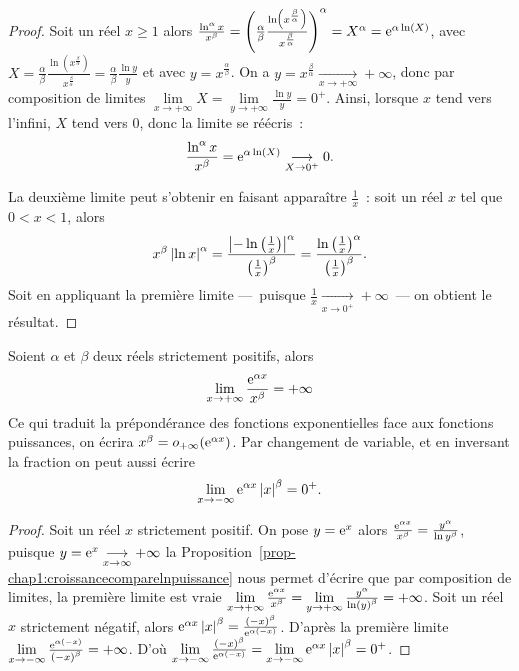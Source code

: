 \begin{proof}
  Soit un réel \(x \geqslant 1\) alors \(\frac{\ln^\alpha x}{x^\beta} =
  {\left(\frac{\alpha}{\beta}
  \frac{\ln\left(x^{\frac{\beta}{\alpha}}\right)}{x^{\frac{\beta}{\alpha}}}
  \right)}^\alpha = X^\alpha = \operatorname{e}^{\alpha \ln(X)}\), avec \(X =
  \frac{\alpha}{\beta}
  \frac{\ln\left(x^{\frac{\beta}{\alpha}}\right)}{x^{\frac{\beta}{\alpha}}}
  = \frac{\alpha}{\beta} \frac{\ln y}{y}\) et avec \(y =
  x^{\frac{\alpha}{\beta}}\). On a \(y =
  x^{\frac{\beta}{\alpha}}\underset{x \to
  +\infty}{\longrightarrow}+\infty\), donc par composition de limites
  \(\lim\limits_{x \to +\infty} X = \lim\limits_{y \to +\infty} \frac{\ln
  y }{y} = 0^{+}\). Ainsi, lorsque \(x\) tend vers l'infini, \(X\) tend
  vers \(0\), donc la limite se réécris~: \[\frac{\ln^\alpha x}{x^\beta}
  = \operatorname{e}^{\alpha \ln(X)} \underset{X \to{} 0^{+}}{\longrightarrow}0.\]

  La deuxième limite peut s'obtenir en faisant apparaître
  \(\frac{1}{x}\)~: soit un réel \(x\) tel que \(0<x<1\), alors \[x^\beta
  \left\lvert\ln x\right\rvert^\alpha =
  \frac{\left\lvert-\ln\left(\frac{1}{x}\right)\right\rvert^\alpha}{{\left(\frac{1}{x}
  \right)}^\beta} =
  \frac{\ln{\left(\frac{1}{x}\right)}^\alpha}{{\left(\frac{1}{x}\right)}^\beta}.\]
  Soit en appliquant la première limite ---~puisque
  \(\frac{1}{x}\underset{x \to{}0^+}{\longrightarrow}+\infty\)~--- on
  obtient le résultat.
\end{proof}

\begin{prop}
  Soient \(\alpha\) et \(\beta\) deux réels strictement positifs, alors
  \begin{equation}
    \lim\limits_{x\to{}+\infty}\frac{\operatorname{e}^{\alpha{}x}}{x^\beta} = +\infty{}
  \end{equation}
  Ce qui traduit la prépondérance des fonctions exponentielles face aux
  fonctions puissances, on écrira \(x^\beta = o_{+\infty}(\operatorname{e}^{\alpha
  x})\).  Par changement de variable, et en inversant la fraction on peut
  aussi écrire
  \begin{equation}
    \lim\limits_{x \to{}-\infty} \operatorname{e}^{\alpha x} \left\lvert x\right\rvert^\beta = 0^+.
  \end{equation}
\end{prop}

\begin{proof}
  Soit un réel \(x\) strictement positif. On pose \(y = \operatorname{e}^{x}\) alors
  \(\frac{\operatorname{e}^{\alpha x}}{x^\beta} = \frac{y^\alpha}{\ln{y}^\beta}\),
  puisque \(y = \operatorname{e}^{x} \underset{x \to \infty}{\longrightarrow}+\infty\) la
  Proposition~\ref{prop-chap1:croissancecomparelnpuissance} nous permet
  d'écrire que par composition de limites, la première limite est vraie
  \(\lim\limits_{x \to + \infty} \frac{\operatorname{e}^{\alpha x}}{x^\beta}=
  \lim\limits_{y \to +\infty} \frac{y^\alpha}{{\ln(y)}^\beta} = +\infty\).
  Soit un réel \(x\) strictement négatif, alors \(\operatorname{e}^{\alpha
  x}\left\lvert x\right\rvert^\beta = \frac{{(-x)}^\beta}{\operatorname{e}^{\alpha(-x)}}\). D'après la
  première limite \(\lim\limits_{x \to -\infty}
  \frac{\operatorname{e}^{\alpha(-x)}}{{(-x)}^\beta} = +\infty\). D'où
  \(\lim\limits_{x\to -\infty}\frac{{(-x)}^\beta}{\operatorname{e}^{\alpha (-x)}} =
  \lim\limits_{x \to -\infty} \operatorname{e}^{\alpha x} \left\lvert x\right\rvert^\beta = 0^+\).
\end{proof}

